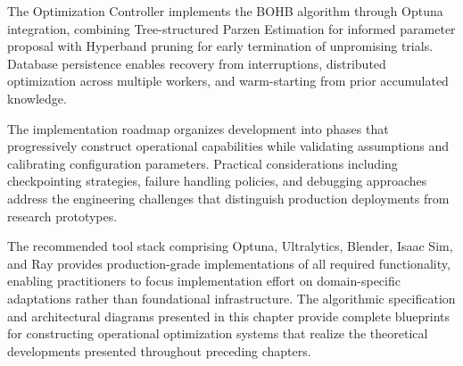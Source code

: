 The Optimization Controller implements the BOHB algorithm through Optuna integration, combining Tree-structured Parzen Estimation for informed parameter proposal with Hyperband pruning for early termination of unpromising trials. Database persistence enables recovery from interruptions, distributed optimization across multiple workers, and warm-starting from prior accumulated knowledge.

The implementation roadmap organizes development into phases that progressively construct operational capabilities while validating assumptions and calibrating configuration parameters. Practical considerations including checkpointing strategies, failure handling policies, and debugging approaches address the engineering challenges that distinguish production deployments from research prototypes.

The recommended tool stack comprising Optuna, Ultralytics, Blender, Isaac Sim, and Ray provides production-grade implementations of all required functionality, enabling practitioners to focus implementation effort on domain-specific adaptations rather than foundational infrastructure. The algorithmic specification and architectural diagrams presented in this chapter provide complete blueprints for constructing operational optimization systems that realize the theoretical developments presented throughout preceding chapters.
